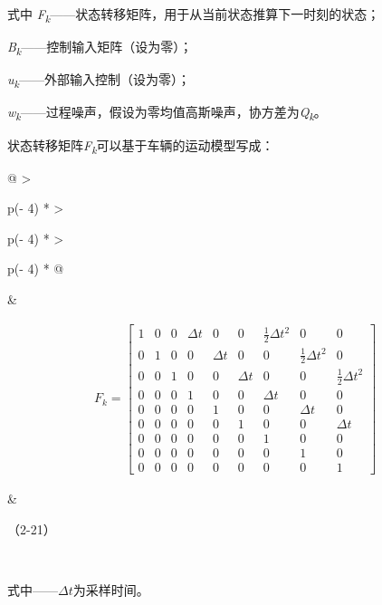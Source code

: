 式中
\emph{F\textsubscript{k}}------状态转移矩阵，用于从当前状态推算下一时刻的状态；

\emph{B\textsubscript{k}}------控制输入矩阵（设为零）；

\emph{u\textsubscript{k}}------外部输入控制（设为零）；

\emph{w\textsubscript{k}}------过程噪声，假设为零均值高斯噪声，协方差为\emph{Q\textsubscript{k}}。

状态转移矩阵\emph{F\textsubscript{k}}可以基于车辆的运动模型写成：

{\def\LTcaptype{none} %
\begin{longtable}[]{@{}
  >{\raggedright\arraybackslash}p{}
  >{\raggedright\arraybackslash}p{}
  >{\raggedright\arraybackslash}p{}@{}}
\toprule\noalign{}
\begin{minipage}[b]{\linewidth}\centering
\end{minipage} & \begin{minipage}[b]{\linewidth}\centering
\[\begin{array}{r}
F_{k} = \begin{bmatrix}
1 & 0 & 0 & \Delta t & 0 & 0 & \frac{1}{2}\Delta t^{2} & 0 & 0 \\
0 & 1 & 0 & 0 & \Delta t & 0 & 0 & \frac{1}{2}\Delta t^{2} & 0 \\
0 & 0 & 1 & 0 & 0 & \Delta t & 0 & 0 & \frac{1}{2}\Delta t^{2} \\
0 & 0 & 0 & 1 & 0 & 0 & \Delta t & 0 & 0 \\
0 & 0 & 0 & 0 & 1 & 0 & 0 & \Delta t & 0 \\
0 & 0 & 0 & 0 & 0 & 1 & 0 & 0 & \Delta t \\
0 & 0 & 0 & 0 & 0 & 0 & 1 & 0 & 0 \\
0 & 0 & 0 & 0 & 0 & 0 & 0 & 1 & 0 \\
0 & 0 & 0 & 0 & 0 & 0 & 0 & 0 & 1
\end{bmatrix}
\end{array}\]
\end{minipage} & \begin{minipage}[b]{\linewidth}\raggedleft
（2-21）
\end{minipage} \\
\midrule\noalign{}
\endhead
\bottomrule\noalign{}
\endlastfoot
\end{longtable}
}

式中------\(\Delta t\)为采样时间。

